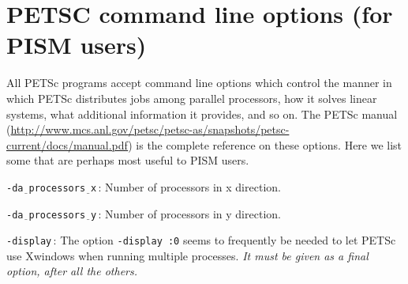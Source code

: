 \documentclass[11pt,final]{amsart}
\newcommand{\rawopt}[1]{\vspace{1mm}\noindent \large\texttt{-#1}\normalsize}
\newcommand{\opt}[1]{\rawopt{#1}\,:\quad}
\newcommand{\optrestrict}[2]{\rawopt{#1}\,[\texttt{#2} \textsl{only}]:\quad}
\newcommand{\optdefrestrict}[3]{\rawopt{#1}\,[\textsl{#2}]\,[\texttt{#3} \textsl{only}]:\quad}
\newcommand{\und}{$\underline{\,\,\,}$}
\begin{document}

\clearpage\newpage
\section{PETSC command line options (for PISM users)}  All PETSc programs accept command line options which control the manner in which PETSc distributes jobs among parallel processors, how it solves linear systems, what additional information it provides, and so on.  The PETSc manual (\url{http://www.mcs.anl.gov/petsc/petsc-as/snapshots/petsc-current/docs/manual.pdf}) is the complete reference on these options.  Here we list some that are perhaps most useful to PISM users.

\opt{da\und processors\und x}  Number of processors in x direction.

\opt{da\und processors\und y}  Number of processors in y direction.

\opt{display}  The option \verb|-display :0| seems to frequently be needed to let PETSc use Xwindows when running multiple processes.  \emph{It must be given as a \emph{final} option, after all the others.}
\end{document}
